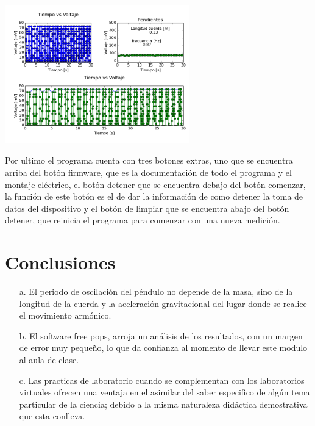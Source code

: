\documentclass[12pt]{article}
\newenvironment{Figure}
{\par\medskip\noindent\minipage{\linewidth}}
{\endminipage\par\medskip}
\begin{document}
\begin{multicols}{2}
\begin{Figure}
\center
\includegraphics[width=9.cm, height=6cm]{fig/Graficas.png}
\label{fig:g16}
\end{Figure}

Por ultimo el programa cuenta con tres botones extras, uno que se encuentra arriba del botón firmware, que es la documentación de todo el programa y el montaje eléctrico, el botón detener que se encuentra debajo del botón comenzar, la función de este botón es el de dar la información de como detener la toma de datos del dispositivo  y el botón de limpiar que se encuentra abajo del botón detener, que reinicia el programa para comenzar con una nueva medición.



\section{Conclusiones}
\begin{enumerate}
\item[a. ] El periodo de oscilación del péndulo no depende de la masa, sino de la longitud de la cuerda y la aceleración gravitacional del lugar donde se realice el movimiento armónico. 

\item[b. ] El software free pops, arroja un análisis de los resultados, con un margen de error muy pequeño, lo que da confianza al momento de llevar este modulo al aula de clase.

\item[c. ] Las practicas de laboratorio cuando se complementan con los laboratorios virtuales ofrecen una ventaja en el asimilar del saber especifico de algún tema particular de la ciencia; debido a la misma naturaleza didáctica demostrativa que esta conlleva.


\end{enumerate}
\end{multicols}
\end{document}
